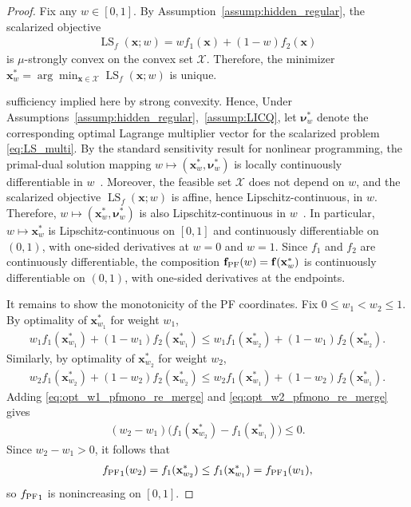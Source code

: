 \documentclass{article}
\newcommand{\bx}{\mathbf{x}}
\newcommand{\X}{\mathcal{X}}
\newcommand{\LS}{\operatorname{LS}}
\newcommand{\f}{\mathbf{f}}
\newcommand{\fPF}{{\mathbf{f}_{\rm PF}}}
\begin{document}
\begin{proof}
Fix any $w\in[0,1]$. By Assumption~\ref{assump:hidden_regular}, the scalarized objective
\begin{align}
\LS_f(\bx;w)=w f_1(\bx)+(1-w)f_2(\bx)
\end{align}
is $\mu$-strongly convex on the convex set $\X$. Therefore, the minimizer
$\bx_w^*=\arg\min_{\bx\in\X}\LS_f(\bx;w)$ is unique.

sufficiency implied here by strong convexity. Hence, 
Under Assumptions~\ref{assump:hidden_regular},~\ref{assump:LICQ}, let $\boldsymbol{\nu}_w^*$ denote the corresponding optimal Lagrange multiplier vector for the scalarized problem \eqref{eq:LS_multi}. By the standard sensitivity result for nonlinear programming, the primal-dual solution mapping
$
w\mapsto (\bx_w^*,\boldsymbol{\nu}_w^*)
$
is locally continuously differentiable in $w$~\cite[Theorem 2.1]{fiacco1976sensitivity}.
Moreover, the feasible set $\X$ does not depend on $w$, and the scalarized objective
$\LS_f(\bx;w)$ is affine, hence Lipschitz-continuous, in $w$. Therefore,
$
w\mapsto (\bx_w^*,\boldsymbol{\nu}_w^*)
$
is also Lipschitz-continuous in $w$~\citep[Theorem 2.16]{ito2008lagrange}. In particular,
$w\mapsto \bx_w^*$ is Lipschitz-continuous on $[0,1]$ and continuously differentiable on $(0,1)$, with one-sided derivatives at $w=0$ and $w=1$.
Since $f_1$ and $f_2$ are continuously differentiable, the composition
$\fPF(w)=\f(\bx_w^*)$ is continuously differentiable on $(0,1)$, with one-sided derivatives at the endpoints. 

It remains to show the monotonicity of the PF coordinates. Fix $0\le w_1<w_2\le 1$. By optimality of $\bx_{w_1}^*$ for weight $w_1$,
\begin{align}
w_1 f_1(\bx_{w_1}^*)+(1-w_1)f_2(\bx_{w_1}^*)
\le
w_1 f_1(\bx_{w_2}^*)+(1-w_1)f_2(\bx_{w_2}^*).
\label{eq:opt_w1_pfmono_re_merge}
\end{align}
Similarly, by optimality of $\bx_{w_2}^*$ for weight $w_2$,
\begin{align}
w_2 f_1(\bx_{w_2}^*)+(1-w_2)f_2(\bx_{w_2}^*)
\le
w_2 f_1(\bx_{w_1}^*)+(1-w_2)f_2(\bx_{w_1}^*).
\label{eq:opt_w2_pfmono_re_merge}
\end{align}
Adding \eqref{eq:opt_w1_pfmono_re_merge} and \eqref{eq:opt_w2_pfmono_re_merge} gives
\begin{align}
(w_2-w_1)\big(f_1(\bx_{w_2}^*)-f_1(\bx_{w_1}^*)\big)\le 0.
\end{align}
Since $w_2-w_1>0$, it follows that
\begin{align}
{f_{\rm PF}}_1(w_2)=f_1(\bx_{w_2}^*)\le f_1(\bx_{w_1}^*)={f_{\rm PF}}_1(w_1),
\end{align}
so ${f_{\rm PF}}_1$ is nonincreasing on $[0,1]$.


\end{proof}
\end{document}
